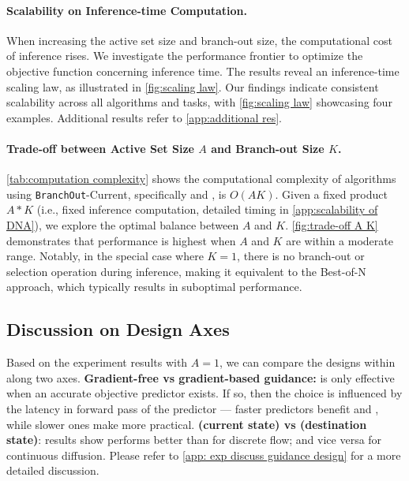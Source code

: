 


\paragraph{Scalability on Inference-time Computation.}
When increasing the active set size and branch-out size, the computational cost of inference rises. We investigate the performance frontier to optimize the objective function concerning inference time. The results reveal an inference-time scaling law, as illustrated in \cref{fig:scaling law}. Our findings indicate consistent scalability across all algorithms and tasks, with \cref{fig:scaling law} showcasing four examples. Additional results refer to \cref{app:additional res}.




\paragraph{Trade-off between Active Set Size $A$ and  Branch-out Size $K$.}  
\cref{tab:computation complexity} shows the computational complexity of algorithms using \texttt{BranchOut}-Current, specifically \xtsampling and \xtgrad, is $O(AK)$. Given a fixed product $A*K$ (i.e., fixed inference computation, detailed timing in \cref{app:scalability of DNA}), we explore the optimal balance between $A$ and $K$. \cref{fig:trade-off A K} demonstrates that performance is highest when $A$ and $K$ are within a moderate range. Notably, in the special case where $K = 1$, there is no branch-out or selection operation during inference, making it equivalent to the Best-of-N approach, which typically results in suboptimal performance.





\subsection{Discussion on Design Axes} \label{sec: exp discuss guidance design}
Based on the experiment results with $A=1$, we can compare the designs within \ouralg along two axes. \textbf{Gradient-free vs gradient-based guidance:} \xtgrad is only effective when an accurate objective predictor exists. If so, then the choice is influenced by the latency in forward pass of the predictor — faster predictors benefit \xtsampling and \xcleansampling, while slower ones make \xtgrad more practical. \textbf{\xtsampling (current state) vs \xcleansampling (destination state)}: results show \xtsampling performs better than \xcleansampling for discrete flow; and vice versa for continuous diffusion. Please refer to \cref{app: exp discuss guidance design} for a more detailed discussion.